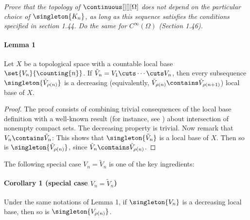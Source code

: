 \textit{
Prove that the topology of $\continuous[][][\Omega]$ does not depend on the particular
choice of $\singleton{K_n}$, as long as this sequence satisfies the conditions 
specified in section 1.44. Do the same for $C^\infty(\Omega)$ (Section 1.46).}
% 
\paragraph{Lemma 1} %
Let $X$ be a topological space with a countable local base %
$\set{V_n}{\counting{n}}$. 
If 
%
  $\tilde{V}_{n} = V_1 \cuts \cdots \cuts V_n$, 
%
then every subsequence 
% 
  $\singleton{\tilde{V}_{\rho(n)}}$ 
%
is a decreasing (equivalently, 
%
  $\tilde{V}_{\rho(n)} \contains \tilde{V}_{\rho(n+1)}$)
%
local base of $X$.
%
\begin{proof}
The proof consists of combining trivial consequences of the local base 
definition with a well-known result (for instance, see ) 
about intersection of nonempty compact sets. %
\skipline
The decreasing property is trivial. Now remark that 
%
  $V_n \contains \tilde{V}_{n}$:
%
This shows that 
%
  $\singleton{\tilde{V}_{n}}$ 
% 
is a local base of $X$. Then so is 
%
  $\singleton{\tilde{V}_{\rho(n)}}$,
% 
since $\tilde{V}_{n} \contains \tilde{V}_{\rho(n)}$.
\end{proof}
%
\noindent The following special case 
%
  $V_{n} = \tilde{V}_{n}$ 
% 
is one of the key ingredients:
\paragraph{Corollary 1 (special case $V_{n} = \tilde{V}_{n}$)}
Under the same notations of Lemma 1, if $\singleton{V_{n}}$ %
is a decreasing local base, then so is $\singleton{V_{\rho(n)}}$.
%
